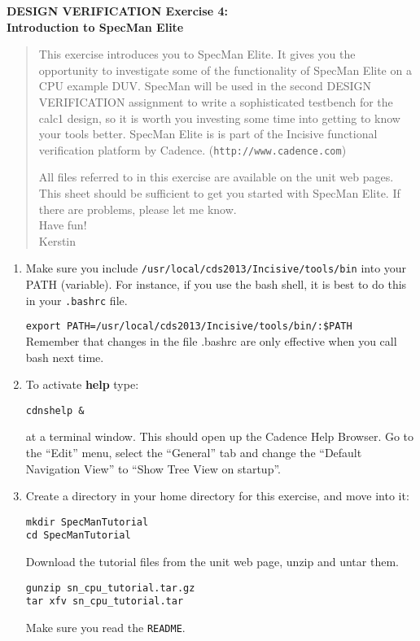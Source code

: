 \documentclass[a4paper,11pt]{article}
\begin{document}
\thispagestyle{empty}
\begin{center}
{\Large\bf DESIGN VERIFICATION Exercise 4: \\ 
\smallskip Introduction to SpecMan Elite}
\end{center}

\begin{quote}
  This exercise introduces you to SpecMan Elite. It gives you the opportunity
  to investigate some of the functionality of SpecMan Elite on a CPU example
  DUV. SpecMan will be used in the second DESIGN VERIFICATION assignment to
  write a sophisticated testbench for the calc1 design, so it is worth you
  investing some time into getting to know your tools better. SpecMan Elite is
  is part of the Incisive functional verification platform by Cadence.
  (\verb#http://www.cadence.com#)
  
  All files referred to in this exercise are available on the unit web
  pages. This sheet should be sufficient to get you started with SpecMan Elite. 
  If there are problems, please let me know. \\ Have fun! \\
  \hspace*{125mm} Kerstin
\end{quote}

\smallskip
{}
\smallskip

\begin{enumerate}

\item Make sure you include {\tt /usr/local/cds2013/Incisive/tools/bin} into
  your PATH (variable). For instance, if you use the bash shell, it is best to
  do this in your {\tt .bashrc} file.

\verb#export PATH=/usr/local/cds2013/Incisive/tools/bin/:$PATH#\\

Remember that changes in the file .bashrc are only effective when you call bash
next time.

\item To activate {\bf help} type:

\verb#cdnshelp &#

at a terminal window. This should open up the Cadence Help Browser. Go to the
``Edit'' menu, select the ``General'' tab and change the 
``Default Navigation View'' to ``Show Tree View on startup''.


\item Create a directory in your home directory for this exercise, 
and move into it:

\verb#mkdir SpecManTutorial#\\
\verb#cd SpecManTutorial#

Download the tutorial files from the unit web page, unzip and untar them.

\verb#gunzip sn_cpu_tutorial.tar.gz#\\
\verb#tar xfv sn_cpu_tutorial.tar#

Make sure you read the \verb#README#.

\end{enumerate}
\end{document}
